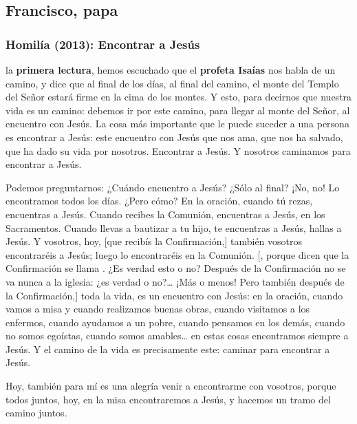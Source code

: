 \newsection

\subsection{Francisco, papa}

\subsubsection{Homilía (2013): Encontrar a Jesús}


\begin{body}
	 la \textbf{primera lectura}, hemos escuchado que el \textbf{profeta Isaías} nos habla de un camino, y dice que al final de los días, al final del camino, el monte del Templo del Señor estará firme en la cima de los montes. Y esto, para decirnos que nuestra vida es un camino: debemos ir por este camino, para llegar al monte del Señor, al encuentro con Jesús. La cosa más importante que le puede suceder a una persona es encontrar a Jesús: este encuentro con Jesús que nos ama, que nos ha salvado, que ha dado su vida por nosotros. Encontrar a Jesús. Y nosotros caminamos para encontrar a Jesús. 
	
	Podemos preguntarnos: ¿Cuándo encuentro a Jesús? ¿Sólo al final? ¡No, no! Lo encontramos todos los días. ¿Pero cómo? En la oración, cuando tú rezas, encuentras a Jesús. Cuando recibes la Comunión, encuentras a Jesús, en los Sacramentos. Cuando llevas a bautizar a tu hijo, te encuentras a Jesús, hallas a Jesús. Y vosotros, hoy, {[}que recibís la Confirmación,{]} también vosotros encontraréis a Jesús; luego lo encontraréis en la Comunión. {[}, porque dicen que la Confirmación se llama . ¿Es verdad esto o no? Después de la Confirmación no se va nunca a la iglesia: ¿es verdad o no?\ldots{} ¡Más o menos! Pero también después de la Confirmación,{]} toda la vida, es un encuentro con Jesús: en la oración, cuando vamos a misa y cuando realizamos buenas obras, cuando visitamos a los enfermos, cuando ayudamos a un pobre, cuando pensamos en los demás, cuando no somos egoístas, cuando somos amables\ldots{} en estas cosas encontramos siempre a Jesús. Y el camino de la vida es precisamente este: caminar para encontrar a Jesús. 
	
	Hoy, también para mí es una alegría venir a encontrarme con vosotros, porque todos juntos, hoy, en la misa encontraremos a Jesús, y hacemos un tramo del camino juntos. 
	

\end{body}
